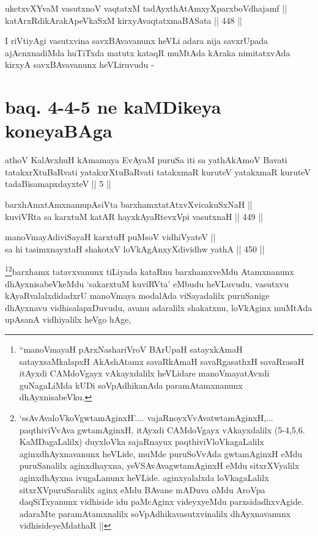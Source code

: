 
\begin{shl}
uketxvXYvaM vasutxnoV vaqtatxM tadAyxthAtAmxyXparxboVdhajamf || \\
katArxRdikArakApeVkaSxM kirxyAvaqtatxmaBASata ||  448 ||  
\end{shl}

\begin{artha}
I riVtiyAgi vasutxvina savxBAvavanunx heVLi adara nija savxrUpada
ajAcnxnadiMda huTiTxda matutx kataqR muMtAda kAraka nimitatxvAda
kirxyA savxBAvavanunx heVLiruvudu -
\end{artha}

\section*{baq. 4-4-5 ne kaMDikeya koneyaBAga}

\begin{shl}
athoV KalAvxhuH kAmamaya EvAyaM puruSa iti sa yathAkAmoV Bavati tatakxrXtuBaRvati yatakxrXtuBaRvati tatakxmaR kuruteV yatakxmaR kuruteV tadaBisamapxdayxteV || 5 ||
\end{shl}

\begin{shl}
barxhAmxtAmxnamupAsiVta barxhamxtatAtxvXvicakuSxNaH ||  \\
kuviVRta sa karxtuM katAR hayxkAyaRtevxV\s pi vasutxnaH ||  449 ||  
\end{shl}

\begin{shl}
manoVmayAdiviSayaH karxtuH puMsoV vidhiVyateV || \\
sa hi tasimxnayxtaH shakotxV loVkAgAnxyXdividhw yathA ||  450 || 
\end{shl}

\begin{artha}
\footnote{``manoVmayaH pArxNashariVroV BArUpaH satayxkAmaH
  satayxsaMkalapxH AkAshAtamx savaRkAmaH savaRgasathxH savaRrasaH
  itAyxdi CAMdoVgayx vAkayxdalilx heVLidare manoVmayatAvxdi
  guNagaLiMda kUDi soVpAdhikanAda paramAtamxnanunx
  dhAyxnisabeVku.}\footnote{`ssAvAvaloVkoVgwtamAginxH'.... vajaRnoyxVvAvatwtamAginxH,... paqthiviVvAva
gwtamAginxH, itAyxdi CAMdoVgayx vAkayxdalilx (5-4,5,6. KaMDagaLalilx)
duyxloVka sajaRnayux paqthiviVloVkagaLalilx aginxdhAyxnavanunx
heVLide, muMde puruSoVvAda gwtamAginxH eMdu puruSanalilx aginxdhayxna,
yeVSAvAvagwtamAginxH eMdu sitxrXVyalilx aginxdhAyxna ivugaLanunx
heVLide. aginxyalalxda loVkagaLalilx sitxrXVpuruSaralilx aginx eMdu
BAvane mADuva oMdu AroVpa daqSiTxyanunx vidhiside idu paMcAginx
videyxyeMdu parxsidadhxvAgide. adaraMte paramAtamxnalilx
soVpAdhikavasutxvinalilx dhAyxnavanunx vidhisideyeMdathaR ||}barxhamx
tatavxvanunx tiLiyada kataRnu barxhamxveMdu
Atamxnanunx dhAyxnisabeVkeMdu `sakarxtuM kuviRVta' eMbudu heVLuvudu,
vasutxvu kAyaRvalalxdidadxrU manoVmaya modalAda viSayadalilx
puruSanige dhAyxnavu vidhisalapxDuvudu, avanu adaralilx shakatxnu,
loVkAginx muMtAda upAsanA vidhiyalilx heVgo hAge, 
\end{artha}


